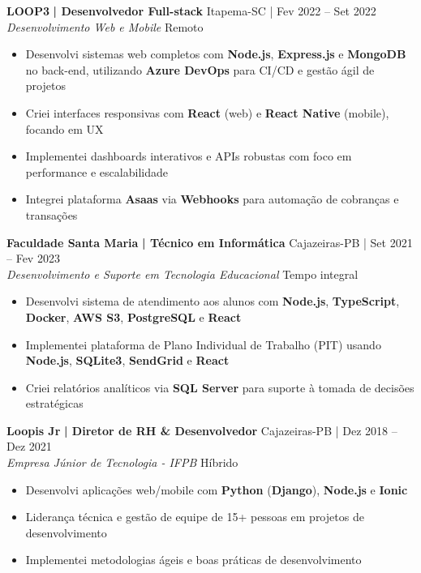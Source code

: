 \documentclass[a4paper]{article}
\begin{document}
\textbf{LOOP3}\textbf{ | Desenvolvedor Full-stack} \hfill Itapema-SC | Fev 2022 -- Set 2022\\
\textit{Desenvolvimento Web e Mobile} \hfill Remoto\\
\vspace{-3mm}
\begin{itemize} \itemsep -3pt
    \item Desenvolvi sistemas web completos com \textbf{Node.js}, \textbf{Express.js} e \textbf{MongoDB} no back-end, utilizando \textbf{Azure DevOps} para CI/CD e gestão ágil de projetos
    \item Criei interfaces responsivas com \textbf{React} (web) e \textbf{React Native} (mobile), focando em UX
    \item Implementei dashboards interativos e APIs robustas com foco em performance e escalabilidade
    \item Integrei plataforma \textbf{Asaas} via \textbf{Webhooks} para automação de cobranças e transações
\end{itemize}

\textbf{Faculdade Santa Maria}\textbf{ | Técnico em Informática} \hfill Cajazeiras-PB | Set 2021 -- Fev 2023\\
\textit{Desenvolvimento e Suporte em Tecnologia Educacional} \hfill Tempo integral\\
\vspace{-3mm}
\begin{itemize} \itemsep -3pt
    \item Desenvolvi sistema de atendimento aos alunos com \textbf{Node.js}, \textbf{TypeScript}, \textbf{Docker}, \textbf{AWS S3}, \textbf{PostgreSQL} e \textbf{React}
    \item Implementei plataforma de Plano Individual de Trabalho (PIT) usando \textbf{Node.js}, \textbf{SQLite3}, \textbf{SendGrid} e \textbf{React}
    \item Criei relatórios analíticos via \textbf{SQL Server} para suporte à tomada de decisões estratégicas
\end{itemize}

\textbf{Loopis Jr}\textbf{ | Diretor de RH \& Desenvolvedor} \hfill Cajazeiras-PB | Dez 2018 -- Dez 2021\\
\textit{Empresa Júnior de Tecnologia - IFPB} \hfill Híbrido\\
\vspace{-3mm}
\begin{itemize} \itemsep -3pt
    \item Desenvolvi aplicações web/mobile com \textbf{Python} (\textbf{Django}), \textbf{Node.js} e \textbf{Ionic}
    \item Liderança técnica e gestão de equipe de 15+ pessoas em projetos de desenvolvimento
    \item Implementei metodologias ágeis e boas práticas de desenvolvimento
\end{itemize}
\end{document}

